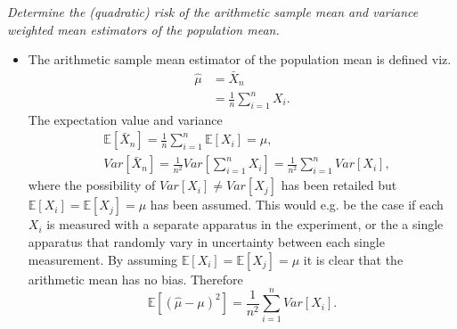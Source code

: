 \begin{example}
	\emph{Determine the (quadratic) risk of the arithmetic sample mean and variance weighted mean estimators of the population mean.}\newline
	
	\begin{itemize}
		\item The arithmetic sample mean estimator of the population mean is defined viz.
		\begin{equation}
			\begin{split}
				\hat{\mu}&=\bar{X}_n\\
				&=\frac{1}{n}\sum_{i=1}^{n}X_i.
			\end{split}
		\end{equation}
		The expectation value and variance 
		\begin{equation}
			\begin{split}
				&\mathbb{E}[\bar{X}_n]=\frac{1}{n}\sum_{i=1}^{n}\mathbb{E}[X_i]=\mu,\\
				&Var[\bar{X}_n]=\frac{1}{n^2}Var[\sum_{i=1}^{n}X_i]=\frac{1}{n^2}\sum_{i=1}^{n}Var[X_i],
			\end{split}
		\end{equation}
		where the possibility of $Var[X_i]\neq Var[X_j]$ has been retailed but $\mathbb{E}[X_i]=\mathbb{E}[X_j]=\mu$ has been assumed. This would e.g. be the case if each $X_i$ is measured with a separate apparatus in the experiment, or the a single apparatus that randomly vary in uncertainty between each single measurement. By assuming $\mathbb{E}[X_i]=\mathbb{E}[X_j]=\mu$ it is clear that the arithmetic mean has no bias. Therefore
		\begin{equation}
			\mathbb{E}[(\hat{\mu}-\mu)^2]=\frac{1}{n^2}\sum_{i=1}^{n}Var[X_i].
		\end{equation}
		

\end{itemize}
\end{example}
